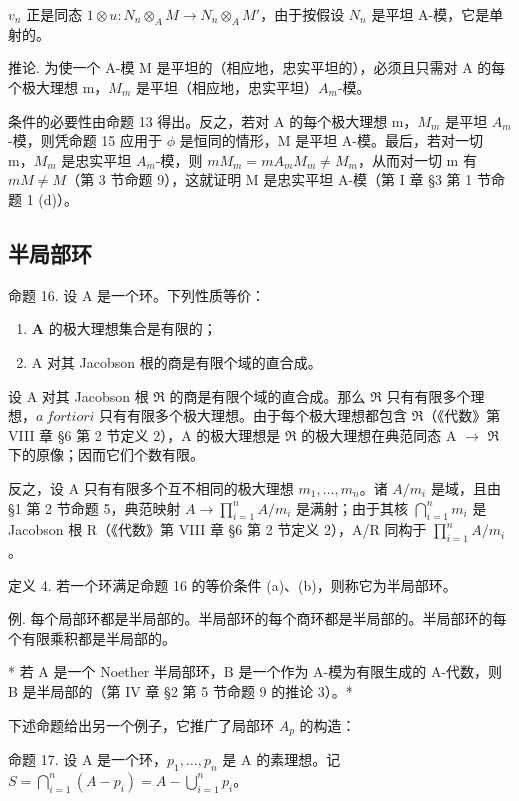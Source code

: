 \(v_{n}\) 正是同态 \(1 \otimes u: N_{n} \otimes_{A} M \to N_{n} \otimes_{A} M'\)，由于按假设 \(N_{n}\) 是平坦 A-模，它是单射的。

推论. 为使一个 A-模 M 是平坦的（相应地，忠实平坦的），必须且只需对 A 的每个极大理想 m，\(M_{m}\) 是平坦（相应地，忠实平坦）\(A_{m}\)-模。

条件的必要性由命题 13 得出。反之，若对 A 的每个极大理想 m，\(M_{m}\) 是平坦 \(A_{m}\)-模，则凭命题 15 应用于 \(\phi\) 是恒同的情形，M 是平坦 A-模。最后，若对一切 m，\(M_{m}\) 是忠实平坦 \(A_{m}\)-模，则 \(mM_{m} = mA_{m}M_{m} \neq M_{m}\)，从而对一切 m 有 \(mM \neq M\)（第 3 节命题 9），这就证明 M 是忠实平坦 A-模（第 I 章 §3 第 1 节命题 1 (d)）。

\subsection{半局部环}

命题 16. 设 A 是一个环。下列性质等价：

\begin{enumerate}
\def\labelenumi{(\alph{enumi})}
\item
  \(\mathbf{A}\) 的极大理想集合是有限的；
\item
  A 对其 Jacobson 根的商是有限个域的直合成。
\end{enumerate}

设 A 对其 Jacobson 根 \(\Re\) 的商是有限个域的直合成。那么 \(\Re\) 只有有限多个理想，\(a\ fortiori\) 只有有限多个极大理想。由于每个极大理想都包含 \(\Re\)（《代数》第 VIII 章 §6 第 2 节定义 2），A 的极大理想是 \(\Re\) 的极大理想在典范同态 A \(\rightarrow\) \(\Re\) 下的原像；因而它们个数有限。

反之，设 A 只有有限多个互不相同的极大理想 \(m_{1}, \ldots, m_{n}\)。诸 \(A/m_{i}\) 是域，且由 §1 第 2 节命题 5，典范映射 \(A \to \prod_{i=1}^{n} A/m_{i}\) 是满射；由于其核 \(\bigcap_{i=1}^{n} m_{i}\) 是 Jacobson 根 R（《代数》第 VIII 章 §6 第 2 节定义 2），A/R 同构于 \(\prod_{i=1}^{n} A/m_{i}\)。

定义 4. 若一个环满足命题 16 的等价条件 (a)、(b)，则称它为半局部环。

例. 每个局部环都是半局部的。半局部环的每个商环都是半局部的。半局部环的每个有限乘积都是半局部的。

* 若 A 是一个 Noether 半局部环，B 是一个作为 A-模为有限生成的 A-代数，则 B 是半局部的（第 IV 章 §2 第 5 节命题 9 的推论 3）。*

下述命题给出另一个例子，它推广了局部环 \(A_{p}\) 的构造：

命题 17. 设 A 是一个环，\(p_1, \ldots, p_n\) 是 A 的素理想。记 \(S = \bigcap_{i=1}^{n} (A - p_i) = A - \bigcup_{i=1}^{n} p_i\)。

